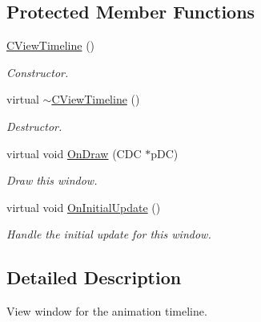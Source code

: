 \subsection*{Protected Member Functions}
\begin{DoxyCompactItemize}
\item 
\hypertarget{class_c_view_timeline_aee8b6ebfaa9e299c65d6be0fc27b79f1}{\hyperlink{class_c_view_timeline_aee8b6ebfaa9e299c65d6be0fc27b79f1}{C\+View\+Timeline} ()}\label{class_c_view_timeline_aee8b6ebfaa9e299c65d6be0fc27b79f1}

\begin{DoxyCompactList}\small\item\em Constructor. \end{DoxyCompactList}\item 
\hypertarget{class_c_view_timeline_afec58a7cb0dfafd6c64c19e9e8a57842}{virtual \hyperlink{class_c_view_timeline_afec58a7cb0dfafd6c64c19e9e8a57842}{$\sim$\+C\+View\+Timeline} ()}\label{class_c_view_timeline_afec58a7cb0dfafd6c64c19e9e8a57842}

\begin{DoxyCompactList}\small\item\em Destructor. \end{DoxyCompactList}\item 
virtual void \hyperlink{class_c_view_timeline_a32f2ff1b162abc49f841e5dd6ddcb7df}{On\+Draw} (C\+D\+C $\ast$p\+D\+C)
\begin{DoxyCompactList}\small\item\em Draw this window. \end{DoxyCompactList}\item 
\hypertarget{class_c_view_timeline_a7996d31301f034cf9fa59e3d846c5fb5}{virtual void \hyperlink{class_c_view_timeline_a7996d31301f034cf9fa59e3d846c5fb5}{On\+Initial\+Update} ()}\label{class_c_view_timeline_a7996d31301f034cf9fa59e3d846c5fb5}

\begin{DoxyCompactList}\small\item\em Handle the initial update for this window. \end{DoxyCompactList}\end{DoxyCompactItemize}


\subsection{Detailed Description}
View window for the animation timeline. 

